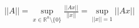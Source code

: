 \documentclass[preview]{standalone}
\begin{document}
\begin{align*}
||A|| = \sup_{x \in \mathbb{R}^n \setminus \{0\}} \frac{||Ax||}{||x||} = \sup_{||x|| = 1} ||Ax||
\end{align*}
\end{document}
